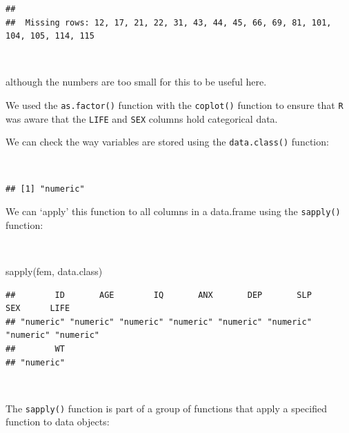 \documentclass[
  12pt,
]{book}
\newenvironment{Shaded}{\begin{snugshade}}{\end{snugshade}}
\newcommand{\FunctionTok}[1]{\textcolor[rgb]{0.00,0.00,0.00}{#1}}
\newcommand{\NormalTok}[1]{#1}
\newcommand{\SpecialCharTok}[1]{\textcolor[rgb]{0.00,0.00,0.00}{#1}}
\begin{document}
\begin{verbatim}
## 
##  Missing rows: 12, 17, 21, 22, 31, 43, 44, 45, 66, 69, 81, 101, 104, 105, 114, 115
\end{verbatim}

~

although the numbers are too small for this to be useful here.

We used the \texttt{as.factor()} function with the \texttt{coplot()} function to ensure that \texttt{R} was aware that the \texttt{LIFE}
and \texttt{SEX} columns hold categorical data.

We can check the way variables are stored using the \texttt{data.class()} function:

~

\begin{Shaded}
\end{Shaded}

\begin{verbatim}
## [1] "numeric"
\end{verbatim}

\newpage

We can `apply' this function to all columns in a data.frame using the \texttt{sapply()} function:

~

\begin{Shaded}
\begin{Highlighting}[]
\FunctionTok{sapply}\NormalTok{(fem, data.class)}
\end{Highlighting}
\end{Shaded}

\begin{verbatim}
##        ID       AGE        IQ       ANX       DEP       SLP       SEX      LIFE 
## "numeric" "numeric" "numeric" "numeric" "numeric" "numeric" "numeric" "numeric" 
##        WT 
## "numeric"
\end{verbatim}

~

The \texttt{sapply()} function is part of a group of functions that apply a specified function to data objects:
\end{document}
